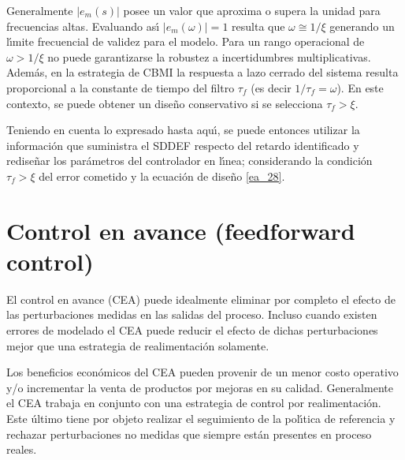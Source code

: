 Generalmente $|e_{m}(s)|$ posee un valor que aproxima o supera la unidad para frecuencias altas. Evaluando
as{\'\i} $|e_{m}(\omega)|=1$ resulta que $\omega\cong 1/\xi$ generando un l{\'\i}mite frecuencial de validez para el
modelo. Para un rango operacional de $\omega>1/\xi$ no puede garantizarse la robustez a incertidumbres
multiplicativas. Adem{\'a}s, en la estrategia de CBMI la respuesta a lazo cerrado del sistema resulta
proporcional a la constante de tiempo del filtro $\tau_{f}$ (es decir $1/\tau_{f}=\omega$). En este
contexto, se puede obtener un dise{\~n}o conservativo si se selecciona $\tau_{f}> \xi$.

Teniendo en cuenta lo expresado hasta aqu{\'\i}, se puede entonces utilizar la informaci{\'o}n que suministra el
SDDEF respecto del retardo identificado y redise{\~n}ar los par{\'a}metros del controlador en l{\'\i}nea; considerando la
condici{\'o}n $\tau_{f}> \xi$ del error cometido y la ecuaci{\'o}n de dise{\~n}o \ref{ea_28}.


\section{Control en avance (feedforward control)}\label{A_6}
El control en avance (CEA) puede idealmente eliminar por completo el efecto de las perturbaciones medidas en
las salidas del proceso. Incluso cuando existen errores de modelado el CEA puede reducir el efecto de dichas
perturbaciones mejor que una estrategia de realimentaci{\'o}n solamente.

Los beneficios econ{\'o}micos del CEA pueden provenir de un menor costo operativo y/o incrementar la venta de
productos por mejoras en su calidad. Generalmente el CEA trabaja en conjunto con una estrategia de control
por realimentaci{\'o}n. Este {\'u}ltimo tiene por objeto realizar el seguimiento de la pol{\'\i}tica de referencia y
rechazar perturbaciones no medidas que siempre est{\'a}n presentes en proceso reales.

